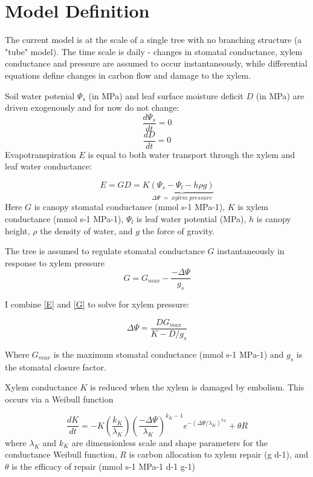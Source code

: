 \documentclass[12pt]{amsart}
\begin{document}
\section{Model Definition}

The current model is at the scale of a single tree with no branching structure (a "tube" model).  The time scale is daily - changes in stomatal conductance, xylem conductance and pressure are assumed to occur instantaneously, while differential equations define changes in carbon flow and damage to the xylem.

Soil water potenial $\Psi_s$ (in MPa) and leaf surface moisture deficit $D$ (in MPa) are driven exogenously and for now do not change:
\begin{equation}\label{Psi_s}
\frac{d\Psi_s}{dt} = 0
\end{equation}
\begin{equation}\label{sD}
\frac{dD}{dt} = 0
\end{equation}
Evapotranspiration $E$ is equal to both water transport through the xylem and leaf water conductance:

\begin{equation}\label{E}
E = GD = K\underbrace{(\Psi_s - \Psi_l - h\rho g)}_{\Delta\Psi \; = \;xylem\;  pressure}
\end{equation}
Here $G$ is canopy stomatal conductance (mmol s-1 MPa-1), $K$ is xylem conductance (mmol s-1 MPa-1), $\Psi_l$ is leaf water potential (MPa), $h$ is canopy height, $\rho$ the density of water, and $g$ the force of gravity.

The tree is assumed to regulate stomatal conductance $G$ instantaneously in response to xylem pressure
\begin{equation}\label{G}
G = G_{max} - \frac{-\Delta\Psi}{g_s}
\end{equation}

I combine \eqref{E} and \eqref{G} to solve for xylem pressure:

\begin{equation}\label{DPsi}
\Delta\Psi = \frac{DG_{max}}{K - D/g_s}
\end{equation}

Where $G_{max}$ is the maximum stomatal conductance (mmol s-1 MPa-1) and $g_s$ is the stomatal closure factor.

Xylem conductance $K$ is reduced when the xylem is damaged by embolism.  This occurs via a Weibull function

\begin{equation}\label{dK}
\frac{dK}{dt} = -K(\frac{k_K}{\lambda_K})(\frac{-\Delta\Psi}{\lambda_K})^{k_K-1}e^{-(\Delta\Psi/\lambda_K)^{k_K}} + \theta R
\end{equation}
where $\lambda_K$ and $k_K$ are dimensionless scale and shape parameters for the conductance Weibull function, $R$ is carbon allocation to xylem repair (g d-1), and $\theta$ is the efficacy of repair (mmol s-1 MPa-1 d-1 g-1)
\end{document}
